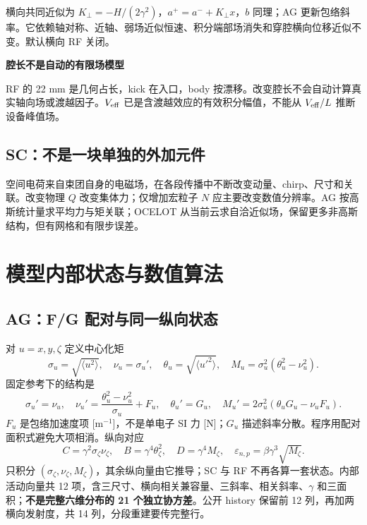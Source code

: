 横向共同近似为 $K_\perp=-H/(2\gamma^2)$，$a^+=a^-+K_\perp x$，$b$ 同理；AG 更新包络斜率。它依赖轴对称、近轴、弱场近似恒速、积分端部场消失和穿腔横向位移近似不变。默认横向 RF 关闭。
\begin{plainbox}\textbf{腔长不是自动的有限场模型}\par
RF 的 22 mm 是几何占长，kick 在入口，body 按漂移。改变腔长不会自动计算真实轴向场或渡越因子。$V_{\rm eff}$ 已是含渡越效应的有效积分幅值，不能从 $V_{\rm eff}/L$ 推断设备峰值场。
\end{plainbox}

\subsection{SC：不是一块单独的外加元件}
空间电荷来自束团自身的电磁场，在各段传播中不断改变动量、chirp、尺寸和关联。改变物理 $Q$ 改变集体力；仅增加宏粒子 $N$ 应主要改变数值分辨率。AG 按高斯统计量求平均力与矩关联；OCELOT 从当前云求自洽近似场，保留更多非高斯结构，但有网格和有限步误差。

\section{模型内部状态与数值算法}\label{sec:models}
\subsection{AG：F/G 配对与同一纵向状态}
对 $u=x,y,\zeta$ 定义中心化矩
\begin{equation}
 \sigma_u=\sqrt{\langle u^2\rangle},\quad\nu_u=\sigma_u',\quad
 \theta_u=\sqrt{\langle u'^2\rangle},\quad M_u=\sigma_u^2(\theta_u^2-\nu_u^2).
\end{equation}
固定参考下的结构是
\begin{equation}
 \sigma_u'=\nu_u,\quad\nu_u'=\frac{\theta_u^2-\nu_u^2}{\sigma_u}+F_u,\quad
 \theta_u'=G_u,\quad M_u'=2\sigma_u^2(\theta_uG_u-\nu_uF_u).
 \label{eq:fg}
\end{equation}
$F_u$ 是包络加速度项 [m$^{-1}$]，不是单电子 SI 力 [N]；$G_u$ 描述斜率分散。程序用配对面积式避免大项相消。纵向对应
\begin{equation}
 C=\gamma^2\sigma_\zeta\nu_\zeta,\quad B=\gamma^4\theta_\zeta^2,\quad
 D=\gamma^4M_\zeta,\quad\varepsilon_{n,p}=\beta\gamma^3\sqrt{M_\zeta}.
\end{equation}
只积分 $(\sigma_\zeta,\nu_\zeta,M_\zeta)$，其余纵向量由它推导；SC 与 RF 不再各算一套状态。内部活动向量共 12 项，含三尺寸、横向相关兼容量、三斜率、相关斜率、$\gamma$ 和三面积；\textbf{不是完整六维分布的 21 个独立协方差}。公开 history 保留前 12 列，再加两横向发射度，共 14 列，分段重建要传完整行。


